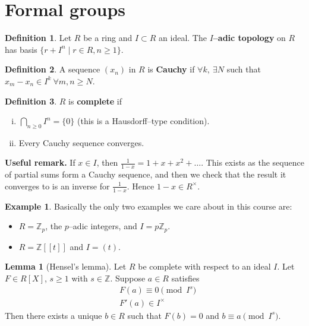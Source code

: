 \documentclass{article}
\theoremstyle{definition}
\newtheorem{lemma}[theorem]{Lemma}
\newtheorem{example}{Example}[section]
\newtheorem{defn}{Definition}[section]
\begin{document}
\section{Formal groups}
\begin{defn}
    Let $R$ be a ring and $I \subset R$ an ideal. The \textbf{$I$--adic topology} on $R$ has basis $\{r+I^n \mid r \in R, n\ge 1\}$.
\end{defn}
\begin{defn}
    A sequence $(x_n)$ in $R$ is \textbf{Cauchy} if $\forall k, ~ \exists N$ such that $x_m - x_n \in I^k ~\forall m,n \ge N$.
\end{defn}
\begin{defn}
    $R$ is \textbf{complete} if 
    \begin{enumerate}[(i)]
        \item $\bigcap_{n\ge 0} I^n = \{0\}$ (this is a Hausdorff--type condition).
        \item Every Cauchy sequence converges.
    \end{enumerate}
\end{defn}
\textbf{Useful remark.} If $x \in I$, then $\frac{1}{1-x}=1+x+x^2+\ldots$. This exists as the sequence of partial sums form a Cauchy sequence, and then we check that the result it converges to is an inverse for $\frac{1}{1-x}$. Hence $1-x \in R^{\times}$.
\begin{example}
    Basically the only two examples we care about in this course are:
    \begin{itemize}
        \item $R = \mathbb{Z}_p$, the $p$--adic integers, and $I = p \mathbb{Z}_p$.
        \item $R = \mathbb{Z}[[t]]$ and $I=(t)$.
    \end{itemize} 
\end{example} 
\begin{lemma}[Hensel's lemma]\label{lemma8.1}
    Let $R$ be complete with respect to an ideal $I$. Let $F \in R[X]$, $s\ge 1$ with $s \in \mathbb{Z}$. Suppose $a \in R$ satisfies 
    \begin{align*}
        &F(a) \equiv 0 \pmod{I^s}\\
        &F'(a) \in I^\times
    \end{align*}
    Then there exists a unique $b \in R$ such that $F(b)=0$ and $b \equiv a \pmod{I^s}$.
\end{lemma}
\end{document}
